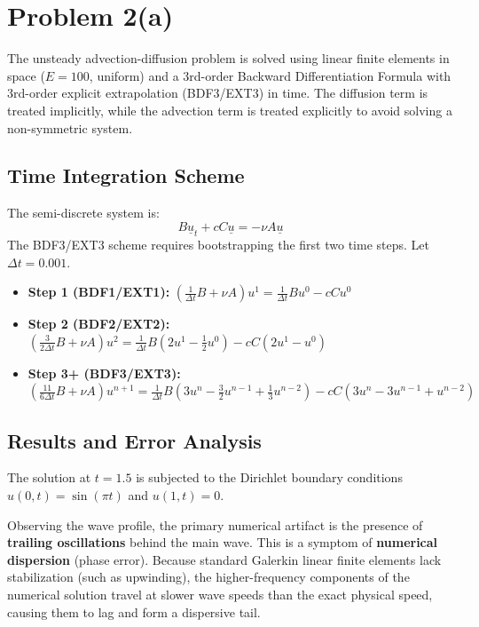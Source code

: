 \documentclass{article}
\begin{document}
\section*{Problem 2(a)}

The unsteady advection-diffusion problem is solved using linear finite elements in space ($E=100$, uniform) and a 3rd-order Backward Differentiation Formula with 3rd-order explicit extrapolation (BDF3/EXT3) in time. The diffusion term is treated implicitly, while the advection term is treated explicitly to avoid solving a non-symmetric system.

\subsection*{Time Integration Scheme}
The semi-discrete system is:
\begin{equation}
    B\underline{u}_t + cC\underline{u} = -\nu A\underline{u}
\end{equation}
The BDF3/EXT3 scheme requires bootstrapping the first two time steps. Let $\Delta t = 0.001$.
\begin{itemize}
    \item \textbf{Step 1 (BDF1/EXT1):} $\left(\frac{1}{\Delta t} B + \nu A\right) u^1 = \frac{1}{\Delta t} B u^0 - c C u^0$
    \item \textbf{Step 2 (BDF2/EXT2):} $\left(\frac{3}{2\Delta t} B + \nu A\right) u^2 = \frac{1}{\Delta t} B \left(2 u^1 - \frac{1}{2} u^0\right) - c C (2 u^1 - u^0)$
    \item \textbf{Step 3+ (BDF3/EXT3):} $\left(\frac{11}{6\Delta t} B + \nu A\right) u^{n+1} = \frac{1}{\Delta t} B \left(3 u^n - \frac{3}{2} u^{n-1} + \frac{1}{3} u^{n-2}\right) - c C (3 u^n - 3 u^{n-1} + u^{n-2})$
\end{itemize}

\subsection*{Results and Error Analysis}
The solution at $t=1.5$ is subjected to the Dirichlet boundary conditions $u(0,t) = \sin(\pi t)$ and $u(1,t) = 0$. 

Observing the wave profile, the primary numerical artifact is the presence of \textbf{trailing oscillations} behind the main wave. This is a symptom of \textbf{numerical dispersion} (phase error). Because standard Galerkin linear finite elements lack stabilization (such as upwinding), the higher-frequency components of the numerical solution travel at slower wave speeds than the exact physical speed, causing them to lag and form a dispersive tail.
\end{document}

